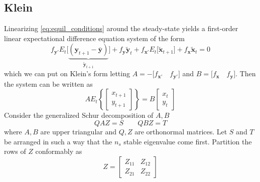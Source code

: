 \documentclass[a4paper,10pt]{article}  %
\begin{document}

\subsection{Klein} %
\label{sub:klein}

Linearizing \eqref{eq:equil_conditions} around the steady-state yields a first-order linear expectational difference
equation system of the form
\begin{equation}
   \label{eq:linearized_equil_conditions}
   f_{ \mathbf{y}' } E_t \Big[ \underbrace{ ( \mathbf{y}_{t+1} -  \bar{\mathbf{y}}) }_{ \tilde{\mathbf{y}}_{t+1} } \Big] 
   + f_{ \mathbf{y} }   \tilde{\mathbf{y}}_t  
   + f_{ \mathbf{x}' }  E_t \Big[  \tilde{\mathbf{x}}_{t+1} \Big]
   + f_{ \mathbf{x} }   \tilde{\mathbf{x}}_{t}
   = 0
\end{equation}
which we can put on Klein's form letting $ A = - \big[f_{ \mathbf{x}' } \quad f_{ \mathbf{y}' } \big] $  and $ B
=\big[f_{ \mathbf{x} } \quad  f_{ \mathbf{y} } \big] $. Then the system can be written as
\begin{equation}
   \label{eq:klein}
   A E_t \left\{ 
   \begin{bmatrix}
      x_{t+1} \\ y_{t+1}
   \end{bmatrix}
   \right\} = 
   B 
   \begin{bmatrix}
      x_{t} \\ y_t 
   \end{bmatrix}
\end{equation}
Consider the generalized Schur decomposition of $ A, B $ 
\begin{equation}
   Q A Z = S \qquad Q B Z = T
\end{equation}
where $ A,B $ are upper triangular and $ Q,Z$ are orthonormal matrices. Let $ S $ and $ T $ be arranged in such a way
that the $ n_s $ stable eigenvalue come first. Partition the rows of $ Z $ conformably as 
\begin{equation*}
   Z = 
   \begin{bmatrix}
      Z_{11} & Z_{12} \\ Z_{21} & Z_{22}
   \end{bmatrix}
\end{equation*}
\end{document}

